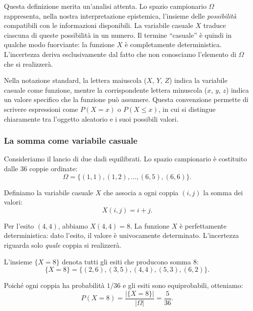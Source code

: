 \documentclass[
  letterpaper,
  DIV=11,
  numbers=noendperiod,
  oneside]{scrreprt}
\theoremstyle{definition}
\theoremstyle{plain}
\theoremstyle{definition}
\theoremstyle{remark}
\begin{document}
Questa definizione merita un'analisi attenta. Lo spazio campionario
\(\Omega\) rappresenta, nella nostra interpretazione epistemica,
l'insieme delle \emph{possibilità} compatibili con le informazioni
disponibili. La variabile casuale \(X\) traduce ciascuna di queste
possibilità in un numero. Il termine ``casuale'' è quindi in qualche
modo fuorviante: la funzione \(X\) è completamente deterministica.
L'incertezza deriva esclusivamente dal fatto che non conosciamo
l'elemento di \(\Omega\) che si realizzerà.

Nella notazione standard, la lettera maiuscola (\(X\), \(Y\), \(Z\))
indica la variabile casuale come funzione, mentre la corrispondente
lettera minuscola (\(x\), \(y\), \(z\)) indica un valore specifico che
la funzione può assumere. Questa convenzione permette di scrivere
espressioni come \(P(X = x)\) o \(P(X \leq x)\), in cui si distingue
chiaramente tra l'oggetto aleatorio e i suoi possibili valori.

\begin{tcolorbox}[enhanced jigsaw, arc=.35mm, breakable, colbacktitle=quarto-callout-note-color!10!white, opacityback=0, toprule=.15mm, rightrule=.15mm, colback=white, opacitybacktitle=0.6, leftrule=.75mm, coltitle=black, bottomtitle=1mm, left=2mm, toptitle=1mm, title=\textcolor{quarto-callout-note-color}{\faInfo}\hspace{0.5em}{Esempio: lancio di due dadi}, titlerule=0mm, bottomrule=.15mm, colframe=quarto-callout-note-color-frame]

\subsubsection*{La somma come variabile
casuale}\label{la-somma-come-variabile-casuale}

Consideriamo il lancio di due dadi equilibrati. Lo spazio campionario è
costituito dalle 36 coppie ordinate: \[
\Omega = \{(1,1), (1,2), \ldots, (6,5), (6,6)\}.
\]

Definiamo la variabile casuale \(X\) che associa a ogni coppia \((i,j)\)
la somma dei valori: \[
X(i,j) = i + j.
\]

Per l'esito \((4,4)\), abbiamo \(X(4,4) = 8\). La funzione \(X\) è
perfettamente deterministica: dato l'esito, il valore è univocamente
determinato. L'incertezza riguarda solo \emph{quale} coppia si
realizzerà.

L'insieme \(\{X = 8\}\) denota tutti gli esiti che producono somma 8: \[
\{X = 8\} = \{(2,6), (3,5), (4,4), (5,3), (6,2)\}.
\]

Poiché ogni coppia ha probabilità \(1/36\) e gli esiti sono
equiprobabili, otteniamo: \[
P(X = 8) = \frac{|\{X = 8\}|}{|\Omega|} = \frac{5}{36}.
\]

\end{tcolorbox}
\end{document}
